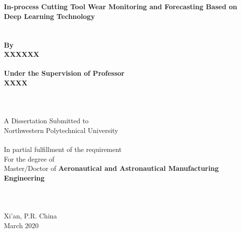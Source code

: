 \begin{titlepage}
	\fTNR
    \begin{spacing}{1.2}
    	\begin{center}
    		\renewcommand{\baselinestretch}{1.2}
    		\renewcommand{\captionfont}{\linespread{1.2}\normalsize}
    		\setmainfont{\TNRFag}
    		\sSanhao ~ \\
    		\sSanhao ~ \\
    		\fTNR \sErhao  \textbf{In-process Cutting Tool Wear Monitoring and Forecasting Based on Deep Learning Technology}
    		\fSong \sXiaoer ~ \\
    		\fSong \sXiaoer ~ \\
    		\fSong \sXiaoer ~ \\
    		\fTNR \sXiaosan \textbf{By}\\
    		\fTNR \sXiaosan \textbf{XXXXXX}\\
    		\fSong \sXiaosan ~ \\
    		\fTNR \sXiaosan \textbf{Under the Supervision of Professor}\\
    		\fTNR \sXiaosan \textbf{XXXX}
    		\fSong \sSanhao ~ \\
    		\fSong \sSanhao ~ \\
    		\fSong \sSanhao ~ \\
    		\fSong \sSanhao ~ \\
    		\fTNR \sXiaosan A Dissertation Submitted to\\
    		\fTNR \sXiaosan Northwestern Polytechnical University \\
    		\fSong \sSanhao ~ \\
    		\fTNR In partial fulfillment of the requirement \\
			\fTNR For the degree of \\
    		\fTNR Master/Doctor of \textbf{Aeronautical and Astronautical Manufacturing Engineering}
    		\fSong \sXiaosan ~\\
    		\fSong \sXiaosan ~\\
    		\fSong \sXiaosan ~\\
    		\fSong \sXiaosan ~\\
    		\fTNR \sXiaosan Xi'an, P.R. China \\
    		\fTNR \sXiaosan March 2020
    	\end{center}
    \end{spacing}
    
\end{titlepage}
\fSong \normalsize

\endinput